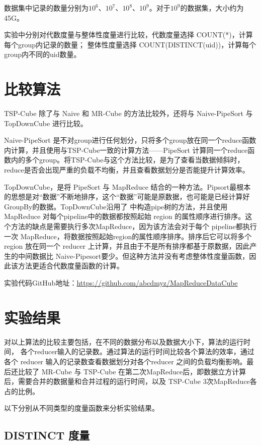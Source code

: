 数据集中记录的数量分别为${10}^{6}$、${10}^{7}$、${10}^{8}$、${10}^{9}$。对于${10}^{9}$的数据集，大小约为45G。

实验中分别对代数度量与整体性度量进行比较，代数度量选择 COUNT(*)，计算每个group内记录的数量； 整体性度量选择 COUNT(DISTINCT(uid))，计算每个group内不同的uid数量。




\section{比较算法}

TSP-Cube 除了与 Naive 和 MR-Cube 的方法比较外，还将与 Naive-PipeSort 与 TopDownCube \cite{lee2012efficient} 进行比较。

Naive-PipeSort 是不对group进行任何划分，只将多个group放在同一个reduce函数内计算，并且使用与TSP-Cube一致的计算方法——PipeSort 计算同一个reduce函数内的多个group。将TSP-Cube与这个方法比较，是为了查看当数据倾斜时，reduce是否会出现严重的负载不均衡，并且查看数据划分是否能提升计算效率。

TopDownCube，是将 PipeSort 与 MapReduce 结合的一种方法。Pipsort最根本的思想是对``数据”不断地排序，这个``数据”可能是原数据，也可能是已经计算好GroupBy的数据。TopDownCube沿用了\cite{agarwal1996computation} 中构造pipe树的方法，并且使用 MapReduce 对每个pipeline中的数据都按照起始 region 的属性顺序进行排序。这个方法的缺点是需要执行多次MapReduce，因为该方法会对于每个 pipeline都执行一次 MapReduce，将数据按照起始region的属性顺序排序。排序后它可以将多个 region 放在同一个 reducer 上计算，并且由于不是所有排序都基于原数据，因此产生的中间数据比 Naive-Pipesort要少。但这种方法并没有考虑整体性度量函数，因此该方法更适合代数度量函数的计算。

实验代码GitHub地址：\url{https://github.com/abcdmyz/MapReduceDataCube}

\section{实验结果}

对以上算法的比较主要包括，在不同的数据分布以及数据大小下，算法的运行时间， 各个reducer输入的记录数。通过算法的运行时间比较各个算法的效率，通过各个 reducer 输入的记录数查看数据划分对各个reducer 之间的负载均衡影响。最后还比较了 MR-Cube 与 TSP-Cube 在第二次MapReduce后，即数据立方计算后，需要合并的数据量和合并过程的运行时间，以及 TSP-Cube 3次MapReduce各占的比例。

以下分别从不同类型的度量函数来分析实验结果。

\subsection{DISTINCT 度量}



